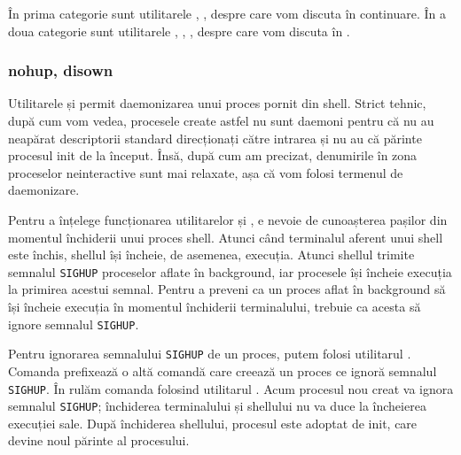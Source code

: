 În prima categorie sunt utilitarele , , despre care vom discuta în
continuare. În a doua categorie sunt utilitarele , , , 
despre care vom discuta în
.

\subsubsection{nohup, disown}
\label{sec:process:nohup-disown}

Utilitarele  și  permit daemonizarea unui proces pornit din shell.
Strict tehnic, după cum vom vedea, procesele create astfel nu sunt daemoni pentru că nu
au neapărat descriptorii standard direcționați către intrarea  și nu au
că părinte procesul init de la început. Însă, după cum am precizat, denumirile
în zona proceselor neinteractive sunt mai relaxate, așa că vom folosi termenul
de daemonizare.

Pentru a înțelege funcționarea utilitarelor  și , e nevoie de
cunoașterea pașilor din momentul închiderii unui proces shell. Atunci când
terminalul aferent unui shell este închis, shellul își încheie, de asemenea, execuția.
Atunci shellul trimite semnalul \texttt{SIGHUP} proceselor aflate în background, iar
procesele își încheie execuția la primirea acestui semnal. Pentru a preveni ca
un proces aflat în background să își încheie execuția în momentul închiderii
terminalului, trebuie ca acesta să ignore semnalul \texttt{SIGHUP}.


Pentru ignorarea semnalului \texttt{SIGHUP} de un proces, putem folosi utilitarul .
Comanda  prefixează o altă comandă care creează un proces ce ignoră
semnalul \texttt{SIGHUP}. În  rulăm comanda  folosind
utilitarul .
Acum procesul  nou creat va ignora semnalul \texttt{SIGHUP}; închiderea
terminalului și shellului nu va duce la încheierea execuției sale. După
închiderea shellului, procesul este adoptat de init, care devine noul părinte
al procesului.


